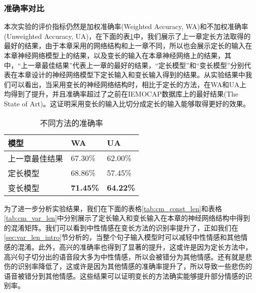 \subsubsection{准确率对比}
\label{sec:var_len_experiement_acc}
本次实验的评价指标仍然是加权准确率(Weighted Accuracy, WA)和不加权准确率(Unweighted Accuracy, UA)，在下面的表\ref{tab:acc_var_len}中，我们展示了上一章定长方法取得的最好的结果，由于本章采用的网络结构和上一章不同，所以也会展示定长的输入在本章神经网络模型上的结果，以及变长的输入在本章神经网络上的结果，其中，“上一章最佳结果”代表上一章的最好的结果，“定长模型”和“变长模型”分别代表在本章设计的神经网络模型下定长输入和变长输入得到的结果。从实验结果中我们可以看出，当采用变长的神经网络结构时，相比于定长的方法，在WA和UA上均得到了提升，并且准确率超过了之前在IEMOCAP数据库上的最好结果(The State of Art)。这证明采用变长的输入比切分成定长的输入能够取得更好的效果。
\begin{table}[htb]
\centering
\begin{minipage}[t]{0.8\linewidth} %
\caption{不同方法的准确率}
\label{tab:acc_var_len}
    \begin{tabularx}{\linewidth}{X<{\centering} X<{\centering} X<{\centering}}
        \toprule[1.5pt]
        模型 & WA & UA \\
        \midrule[1pt]
        上一章最佳结果 & 67.30\% & 62.00\% \\
        定长模型 & 68.86\% & 57.45\% \\
        变长模型 & \textbf{71.45\%} & \textbf{64.22\%} \\
        \bottomrule[1.5pt]
    \end{tabularx}
\end{minipage}
\end{table}

为了进一步分析实验结果，我们在下面的表格\ref{tab:cm_const_len}和表格\ref{tab:cm_var_len}中分别展示了定长输入和变长输入在本章的神经网络结构中得到的混淆矩阵。我们可以看到中性情感在变长方法的识别率提升了，正如我们在\ref{sec:var_len_intro}节分析的，当整个句子输入模型时可以减轻中性情感和其他情感的混淆。此外，高兴的准确率也得到了显著的提升，这或许是因为定长方法中，高兴句子切分出的语音段大多为中性情感，所以会被错分为其他情感。还有就是悲伤的识别率降低了，这或许是因为其他情感的准确率提升了，所以导致一些悲伤的语音被错分到其他情感。这些结果可以证明变长的方法确实能够提升部分情感的识别率。

